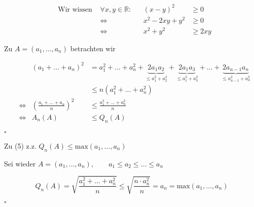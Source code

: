\documentclass[12pt,a4paper,leqno]{article}
\begin{document}
\begin{description}
\begin{itemize}
\begin{align*}
&\textrm{Wir wissen } &\forall x,y \in \mathbb{R}: && (x-y)^2 & \geq 0 \\
&& \Leftrightarrow &&x^2 - 2xy + y^2 &\geq 0 \\
&& \Leftrightarrow &&x^2 + y^2 &\geq 2xy
\end{align*}

Zu $A=(a_1,\dotsc, a_n)$ betrachten wir

\begin{align*}
&&(a_1 +\ldots + a_n)^2 &= a_1^2 + ... + a_n^2 + \underbrace{2a_1 a_2}_{\leq a_1^2+a_2^2} + \underbrace{2a_1 a_3}_{\leq a_1^2+a_3^2} + ... + \underbrace{2a_{n-1} a_n}_{\leq a_{n-1}^2+a_n^2} \\
&&& \leq n ( a_1^2 + ... + a_n^2 ) \\
&\Leftrightarrow &\left( \frac{a_1 + \ldots + a_n}{n} \right) ^ 2 &\leq \frac{a_1^2 + ... + a_n^2}{n} \\
&\Leftrightarrow &A_n(A) &\leq Q_n(A)
\end{align*}
\begin{flushright}$\square$\end{flushright}

Zu (5) z.z. $Q_n(A) \leq \textrm{max}(a_1,\dotsc, a_n)$

Sei wieder $A = (a_1,\dotsc, a_n) , \qquad a_1 \leq a_2 \leq \ldots \leq a_n$

$$Q_n(A) = \sqrt{\frac{a_1^2 + ... + a_n^2}{n}} \leq \sqrt{\frac{n \cdot a_n^2}{n}} = a_n = \textrm{max}(a_1,\dotsc, a_n)$$

\begin{flushright}$\square$\end{flushright}
\end{itemize}
\end{description}
\end{document}
